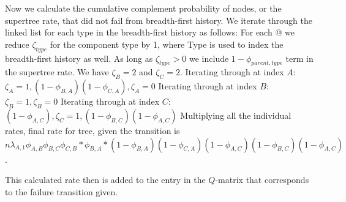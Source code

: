 \documentclass{article}
\begin{document}
Now we calculate the cumulative complement probability of nodes, or the supertree rate, that did not fail from breadth-first history.
We iterate through the linked list for each type in the breadth-first history as follows:
For each @ we reduce  $\zeta_{type}$ for the component type by 1, where Type is used to index the breadth-first history as well. As long as  $\zeta_{type} > 0$ we include $1 - \phi_{parent, type}$ term in the supertree rate. We have  $\zeta_{B} = 2$ and  $\zeta_{C}= 2$.
Iterating through at index $A$: $\zeta_{A} = 1, (1 - \phi_{B, A}) (1 - \phi_{C, A}), \zeta_{A} = 0$
Iterating through at index $B$: $\zeta_{B} = 1, \zeta_{B} = 0$
Iterating through at index $C$: $ (1 - \phi_{A, C}), \zeta_{C} = 1, (1 - \phi_{B, C}) (1 - \phi_{A, C}) $
Multiplying all the individual rates, final rate for tree, given the transition is $ n \lambda_{A, 1} \phi_{A, B} \phi_{B, C} \phi_{C, B} * \phi_{B, A} * (1 - \phi_{B, A}) (1 - \phi_{C, A}) (1 - \phi_{A, C}) (1 - \phi_{B, C}) (1 - \phi_{A, C}) $.

This calculated rate then is added to the entry in the $Q$-matrix that corresponds to the failure transition given.

\fi
\end{document}

